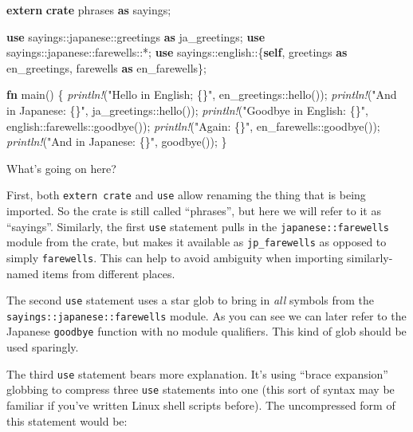 \documentclass[a4paper,]{book}
\newenvironment{Shaded}{\begin{snugshade}}{\end{snugshade}}
\newcommand{\KeywordTok}[1]{\textcolor[rgb]{0.13,0.29,0.53}{\textbf{{#1}}}}
\newcommand{\StringTok}[1]{\textcolor[rgb]{0.31,0.60,0.02}{{#1}}}
\newcommand{\PreprocessorTok}[1]{\textcolor[rgb]{0.56,0.35,0.01}{\textit{{#1}}}}
\newcommand{\NormalTok}[1]{{#1}}
\begin{document}
\begin{Shaded}
\begin{Highlighting}[]
\KeywordTok{extern} \KeywordTok{crate} \NormalTok{phrases }\KeywordTok{as} \NormalTok{sayings;}

\KeywordTok{use} \NormalTok{sayings::japanese::greetings }\KeywordTok{as} \NormalTok{ja_greetings;}
\KeywordTok{use} \NormalTok{sayings::japanese::farewells::*;}
\KeywordTok{use} \NormalTok{sayings::english::\{}\KeywordTok{self}\NormalTok{, greetings }\KeywordTok{as} \NormalTok{en_greetings, farewells }\KeywordTok{as} \NormalTok{en_farewells\};}

\KeywordTok{fn} \NormalTok{main() \{}
    \PreprocessorTok{println!}\NormalTok{(}\StringTok{"Hello in English; \{\}"}\NormalTok{, en_greetings::hello());}
    \PreprocessorTok{println!}\NormalTok{(}\StringTok{"And in Japanese: \{\}"}\NormalTok{, ja_greetings::hello());}
    \PreprocessorTok{println!}\NormalTok{(}\StringTok{"Goodbye in English: \{\}"}\NormalTok{, english::farewells::goodbye());}
    \PreprocessorTok{println!}\NormalTok{(}\StringTok{"Again: \{\}"}\NormalTok{, en_farewells::goodbye());}
    \PreprocessorTok{println!}\NormalTok{(}\StringTok{"And in Japanese: \{\}"}\NormalTok{, goodbye());}
\NormalTok{\}}
\end{Highlighting}
\end{Shaded}

What's going on here?

First, both \texttt{extern\ crate} and \texttt{use} allow renaming the
thing that is being imported. So the crate is still called ``phrases'',
but here we will refer to it as ``sayings''. Similarly, the first
\texttt{use} statement pulls in the \texttt{japanese::farewells} module
from the crate, but makes it available as \texttt{jp\_farewells} as
opposed to simply \texttt{farewells}. This can help to avoid ambiguity
when importing similarly-named items from different places.

The second \texttt{use} statement uses a star glob to bring in
\emph{all} symbols from the \texttt{sayings::japanese::farewells}
module. As you can see we can later refer to the Japanese
\texttt{goodbye} function with no module qualifiers. This kind of glob
should be used sparingly.

The third \texttt{use} statement bears more explanation. It's using
``brace expansion'' globbing to compress three \texttt{use} statements
into one (this sort of syntax may be familiar if you've written Linux
shell scripts before). The uncompressed form of this statement would be:
\end{document}
